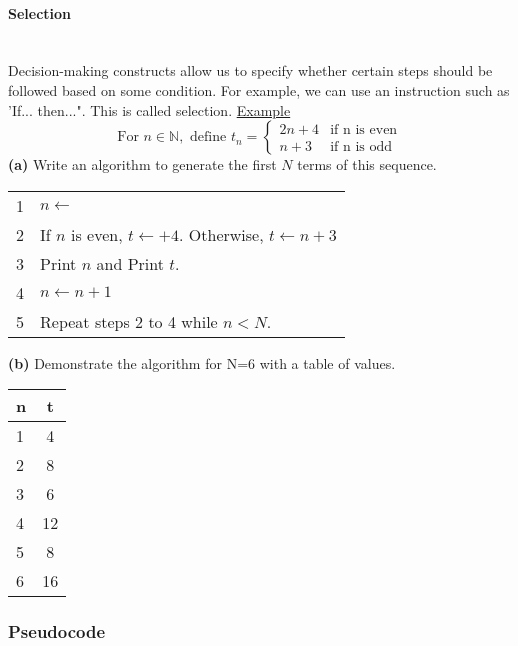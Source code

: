 \documentclass[a4paper]{article}
\begin{document}
				\paragraph{Selection}\mbox{}\\
					Decision-making constructs allow us to specify whether certain steps should be followed based on some condition. For example, we can use an instruction such as 'If... then...". This is called selection.
					\newpage
					\noindent\underline{Example}\newline
					\[
						\text{For }n\in\mathbb{N},\text{ define }t_n=\begin{cases}
							2n+4 & \text{if n is even} \\
							n+3 & \text{if n is odd}
						\end{cases}
					\]
					\textbf{(a)} Write an algorithm to generate the first $N$ terms of this sequence.
					\bgroup
					\def\arraystretch{1.5}
					\begin{table}[h]
						\centering
						\begin{tabular}{|l|l|}
							\hline
							1 & $n\gets$ \\
							2 & If $n$ is even, $t\gets+4$. Otherwise, $t\gets n+3$ \\
							3 & Print $n$ and Print $t$. \\
							4 & $n\gets n+1$ \\
							5 & Repeat steps 2 to 4 while $n<N$. \\
							\hline
						\end{tabular}
					\end{table}
					\egroup
					\newline\textbf{(b)} Demonstrate the algorithm for N=6 with a table of values.
					\bgroup
					\def\arraystretch{1.5}
					\begin{table}[h]
						\centering
						\begin{tabular}{|l|c|}
							\hline
							n & t \\
							\hline
							1 & 4 \\
							2 & 8 \\
							3 & 6 \\
							4 & 12 \\
							5 & 8 \\
							6 & 16 \\
							\hline
						\end{tabular}
					\end{table}
					\egroup
			\subsubsection{Pseudocode}
\end{document}
